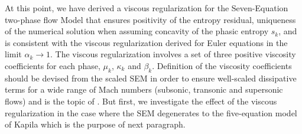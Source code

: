\documentclass[preprint,10pt]{elsarticle}
\begin{document}
%
At this point, we have derived a viscous regularization for the Seven-Equation two-phase flow Model that ensures positivity of the 
entropy residual, uniqueness of the numerical solution when assuming concavity of the phasic entropy $s_k$, and is consistent with 
the viscous regularization derived for Euler equations \cite{jlg, Marco_paper_low_mach} in the limit $\alpha_k \to 1$. The viscous 
regularization involves a set of three positive viscosity coefficients for each phase, $\mu_k$, $\kappa_k$ and $\beta_k$. Definition 
of the viscosity coefficients should be devised from the scaled SEM in order to ensure well-scaled dissipative terms for a wide range 
of Mach numbers (subsonic, transonic and supersonic flows) and is the topic of . But first, we investigate the effect 
of the viscous regularization in the case where the SEM degenerates to the five-equation model of Kapila \cite{Kapila_2001} which is the purpose of next paragraph.
%
\end{document}
